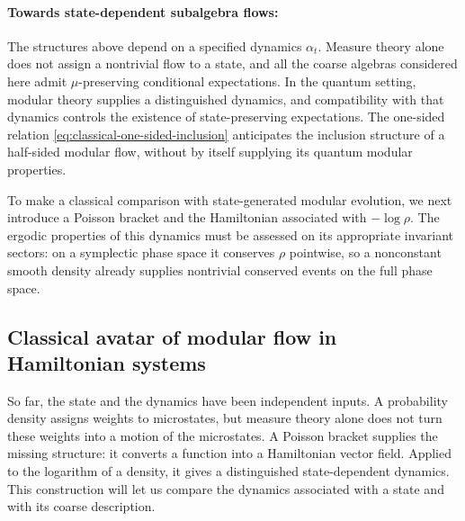 \documentclass[a4paper,11pt]{article}
\theoremstyle{definition}
\begin{document}
\paragraph{Towards state-dependent subalgebra flows:}
The structures above depend on a specified dynamics $\alpha_t$. Measure theory alone does not assign a nontrivial flow to a state, and all the coarse algebras considered here admit $\mu$-preserving conditional expectations. In the quantum setting, modular theory supplies a distinguished dynamics, and compatibility with that dynamics controls the existence of state-preserving expectations. The one-sided relation \eqref{eq:classical-one-sided-inclusion} anticipates the inclusion structure of a half-sided modular flow, without by itself supplying its quantum modular properties.

To make a classical comparison with state-generated modular evolution, we next introduce a Poisson bracket and the Hamiltonian associated with $-\log\rho$. The ergodic properties of this dynamics must be assessed on its appropriate invariant sectors: on a symplectic phase space it conserves $\rho$ pointwise, so a nonconstant smooth density already supplies nontrivial conserved events on the full phase space.

\subsection{Classical avatar of modular flow in Hamiltonian systems}
\label{subsec:classical-state-flow}

So far, the state and the dynamics have been independent inputs. A probability density assigns weights to microstates, but measure theory alone does not turn these weights into a motion of the microstates. A Poisson bracket supplies the missing structure: it converts a function into a Hamiltonian vector field. Applied to the logarithm of a density, it gives a distinguished state-dependent dynamics. This construction will let us compare the dynamics associated with a state and with its coarse description.
\end{document}
